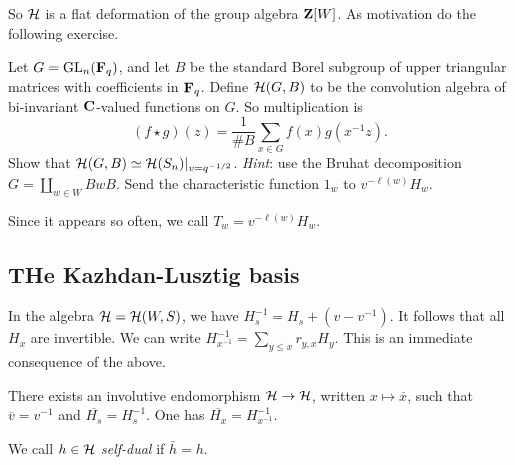 \documentclass{article}
\begin{document}
So $\mathcal{H}$ is a flat deformation of the group algebra $\mathbf{Z}[W]$. As motivation 
do the following exercise. 

\begin{exercise}
Let $G=\operatorname{GL}_n(\mathbf{F}_q)$, and let $B$ be the standard Borel subgroup of 
upper triangular matrices with coefficients in $\mathbf{F}_q$. Define 
$\mathcal{H}(G,B)$ to be the convolution algebra of bi-invariant $\mathbf{C}$-valued functions 
on $G$. So multiplication is 
\[
  (f\star g)(z) = \frac{1}{\# B} \sum_{x\in G} f(x) g(x^{-1} z) .
\]
Show that $\mathcal{H}(G,B) \simeq \mathcal{H}(S_n)|_{v=q^{-1/2}}$. \emph{Hint}: use the 
Bruhat decomposition $G=\coprod_{w\in W} B w B$. Send the characteristic function 
$1_w$ to $v^{-\ell(w)} H_w$. 
\end{exercise}

Since it appears so often, we call $T_w=v^{-\ell(w)} H_w$. 


\subsection{THe Kazhdan-Lusztig basis}

In the algebra $\mathcal{H}=\mathcal{H}(W,S)$, we have $H_s^{-1} = H_s+(v-v^{-1})$. It follows 
that all $H_x$ are invertible. We can write 
$H_{x^{-1}}^{-1} = \sum_{y\leqslant x} r_{y,x} H_y$. This is an immediate 
consequence of the above. 

\begin{lemma}
There exists an involutive endomorphism $\mathcal{H}\to \mathcal{H}$, written 
$x\mapsto \overline x$, such that $\overline v = v^{-1}$ and 
$\overline{H_s} = H_s^{-1}$. One has $\overline{H_x} = H_{x^{-1}}^{-1}$. 
\end{lemma}

We call $h\in \mathcal{H}$ \emph{self-dual} if $\bar h=h$. 
\end{document}
